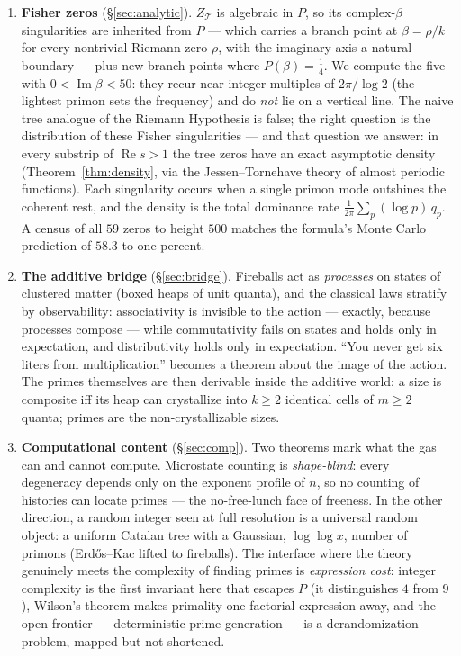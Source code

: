 \documentclass[11pt]{article}
\newcommand{\cT}{\mathcal{T}}   %
\numberwithin{equation}{section}
\theoremstyle{plain}
\theoremstyle{definition}
\theoremstyle{remark}
\begin{document}
\begin{enumerate}
\item \textbf{Fisher zeros} (\S\ref{sec:analytic}). $Z_\cT$ is algebraic in $P$, so
its complex-$\beta$ singularities are inherited from $P$ --- which carries a branch
point at $\beta = \rho/k$ for every nontrivial Riemann zero $\rho$, with the imaginary
axis a natural boundary --- plus new branch points where $P(\beta) = \tfrac14$. We
compute the five with $0 < \operatorname{Im}\beta < 50$: they recur near integer
multiples of $2\pi/\log 2$ (the lightest primon sets the frequency) and do \emph{not}
lie on a vertical line. The naive tree analogue of the Riemann Hypothesis is false;
the right question is the distribution of these Fisher singularities --- and that
question we answer: in every substrip of $\operatorname{Re} s > 1$ the tree zeros
have an exact asymptotic density (Theorem~\ref{thm:density}, via the
Jessen--Tornehave theory of almost periodic functions). Each singularity occurs when
a single primon mode outshines the coherent rest, and the density is the total
dominance rate $\frac{1}{2\pi}\sum_p (\log p)\, q_p$. A census of all $59$ zeros to
height $500$ matches the formula's Monte Carlo prediction of $58.3$ to one percent.

\item \textbf{The additive bridge} (\S\ref{sec:bridge}). Fireballs act as
\emph{processes} on states of clustered matter (boxed heaps of unit quanta), and the
classical laws stratify by observability: associativity is invisible to the action
--- exactly, because processes compose --- while commutativity fails on states and
holds only in expectation, and distributivity holds only in expectation. ``You never
get six liters from multiplication'' becomes a theorem about the image of the action.
The primes themselves are then derivable inside the additive world: a size is
composite iff its heap can crystallize into $k \ge 2$ identical cells of $m \ge 2$
quanta; primes are the non-crystallizable sizes.

\item \textbf{Computational content} (\S\ref{sec:comp}). Two theorems mark what the
gas can and cannot compute. Microstate counting is \emph{shape-blind}: every
degeneracy depends only on the exponent profile of $n$, so no counting of histories
can locate primes --- the no-free-lunch face of freeness. In the other direction, a
random integer seen at full resolution is a universal random object: a uniform
Catalan tree with a Gaussian, $\log\log x$, number of primons (Erd\H{o}s--Kac lifted
to fireballs). The interface where the theory genuinely meets the complexity of
finding primes is \emph{expression cost}: integer complexity is the first invariant
here that escapes $P$ (it distinguishes $4$ from $9$), Wilson's theorem makes
primality one factorial-expression away, and the open frontier --- deterministic
prime generation --- is a derandomization problem, mapped but not shortened.
\end{enumerate}
\end{document}
